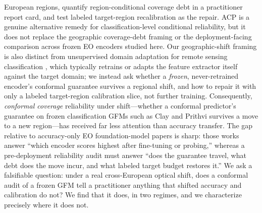 \documentclass[preprint,11pt,authoryear]{elsarticle}
\begin{document}
European regions, quantify region-conditional coverage debt in a practitioner report card, and test labeled
target-region recalibration as the repair. ACP is a genuine alternative remedy for classification-level
conditional reliability, but it does not replace the geographic coverage-debt framing or the
deployment-facing comparison across frozen EO encoders studied here. Our geographic-shift framing is also
distinct from unsupervised domain adaptation for remote sensing classification
\citep{tuia2016domain,zhu2017deep,hong2023crosscity}, which typically retrains or adapts the feature
extractor itself against the target domain; we instead ask whether a \emph{frozen}, never-retrained
encoder's conformal guarantee survives a regional shift, and how to repair it with only a labeled
target-region calibration slice, not further training.
Consequently, \emph{conformal coverage} reliability under shift---whether a conformal predictor's guarantee
on frozen classification GFMs such as Clay and Prithvi survives a move to a new region---has received far
less attention than accuracy transfer. The gap relative to accuracy-only EO foundation-model papers is
sharp: those works answer ``which encoder scores highest after fine-tuning or probing,'' whereas a
pre-deployment reliability audit must answer ``does the guarantee travel, what debt does the move incur,
and what labeled target budget restores it.'' We ask a falsifiable question: under a real cross-European
optical shift, does a conformal audit of a frozen GFM tell a practitioner anything that shifted accuracy
and calibration do not? We find that it does, in two regimes, and we characterize precisely where it does
not.
\end{document}
